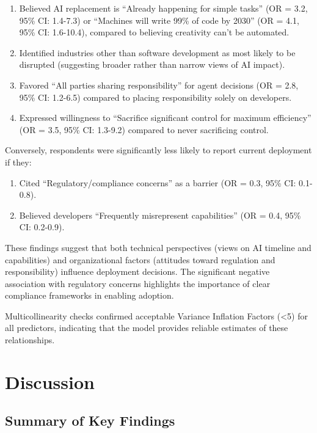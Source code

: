 \documentclass{article}
\begin{document}
\begin{enumerate}
\def\labelenumi{\arabic{enumi}.}
\item
  Believed AI replacement is ``Already happening for simple tasks'' (OR
  = 3.2, 95\% CI: 1.4-7.3) or ``Machines will write 99\% of code by
  2030'' (OR = 4.1, 95\% CI: 1.6-10.4), compared to believing creativity
  can't be automated.
\item
  Identified industries other than software development as most likely
  to be disrupted (suggesting broader rather than narrow views of AI
  impact).
\item
  Favored ``All parties sharing responsibility'' for agent decisions (OR
  = 2.8, 95\% CI: 1.2-6.5) compared to placing responsibility solely on
  developers.
\item
  Expressed willingness to ``Sacrifice significant control for maximum
  efficiency'' (OR = 3.5, 95\% CI: 1.3-9.2) compared to never
  sacrificing control.
\end{enumerate}

Conversely, respondents were significantly less likely to report current
deployment if they:

\begin{enumerate}
\def\labelenumi{\arabic{enumi}.}
\item
  Cited ``Regulatory/compliance concerns'' as a barrier (OR = 0.3, 95\%
  CI: 0.1-0.8).
\item
  Believed developers ``Frequently misrepresent capabilities'' (OR =
  0.4, 95\% CI: 0.2-0.9).
\end{enumerate}

These findings suggest that both technical perspectives (views on AI
timeline and capabilities) and organizational factors (attitudes toward
regulation and responsibility) influence deployment decisions. The
significant negative association with regulatory concerns highlights the
importance of clear compliance frameworks in enabling adoption.

Multicollinearity checks confirmed acceptable Variance Inflation Factors
(\textless5) for all predictors, indicating that the model provides
reliable estimates of these relationships.


\section{Discussion}\label{discussion}

\subsection{Summary of Key Findings}\label{summary-of-key-findings}
\end{document}
